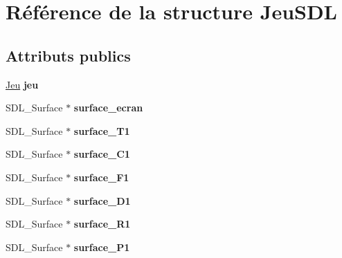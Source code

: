 \hypertarget{struct_jeu_s_d_l}{\section{Référence de la structure Jeu\-S\-D\-L}
\label{struct_jeu_s_d_l}
}
\subsection*{Attributs publics}
\begin{DoxyCompactItemize}
\item 
\hypertarget{struct_jeu_s_d_l_a1faf87ef25a9329a5988befb56212655}{\hyperlink{struct_jeu}{Jeu} {\bfseries jeu}}\label{struct_jeu_s_d_l_a1faf87ef25a9329a5988befb56212655}

\item 
\hypertarget{struct_jeu_s_d_l_a2730a9cf37f63a3eab225cb115ee7488}{S\-D\-L\-\_\-\-Surface $\ast$ {\bfseries surface\-\_\-ecran}}\label{struct_jeu_s_d_l_a2730a9cf37f63a3eab225cb115ee7488}

\item 
\hypertarget{struct_jeu_s_d_l_a66b55be001b514d12a5ef82ddc402d89}{S\-D\-L\-\_\-\-Surface $\ast$ {\bfseries surface\-\_\-\-T1}}\label{struct_jeu_s_d_l_a66b55be001b514d12a5ef82ddc402d89}

\item 
\hypertarget{struct_jeu_s_d_l_a0adc4c61cbef4a80813718b8e821213c}{S\-D\-L\-\_\-\-Surface $\ast$ {\bfseries surface\-\_\-\-C1}}\label{struct_jeu_s_d_l_a0adc4c61cbef4a80813718b8e821213c}

\item 
\hypertarget{struct_jeu_s_d_l_a3e8682c44f6153dcb1b7dbb259ec543c}{S\-D\-L\-\_\-\-Surface $\ast$ {\bfseries surface\-\_\-\-F1}}\label{struct_jeu_s_d_l_a3e8682c44f6153dcb1b7dbb259ec543c}

\item 
\hypertarget{struct_jeu_s_d_l_a1e061a09c6592514799e924c0c7f365f}{S\-D\-L\-\_\-\-Surface $\ast$ {\bfseries surface\-\_\-\-D1}}\label{struct_jeu_s_d_l_a1e061a09c6592514799e924c0c7f365f}

\item 
\hypertarget{struct_jeu_s_d_l_aeace53e3ed5b3c29736f34415547a08f}{S\-D\-L\-\_\-\-Surface $\ast$ {\bfseries surface\-\_\-\-R1}}\label{struct_jeu_s_d_l_aeace53e3ed5b3c29736f34415547a08f}

\item 
\hypertarget{struct_jeu_s_d_l_ac7a94a0f4d490e10b1adc281a4b9eaca}{S\-D\-L\-\_\-\-Surface $\ast$ {\bfseries surface\-\_\-\-P1}}\label{struct_jeu_s_d_l_ac7a94a0f4d490e10b1adc281a4b9eaca}


\end{DoxyCompactItemize}
